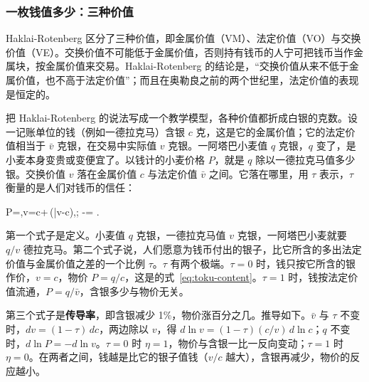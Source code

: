 
\subsubsection{一枚钱值多少：三种价值}
Haklai-Rotenberg 区分了三种价值，即金属价值（VM）、法定价值（VO）与交换价值（VE）。交换价值不可能低于金属价值，否则持有钱币的人宁可把钱币当作金属块，按金属价值来交易。Haklai-Rotenberg 的结论是，“交换价值从来不低于金属价值，也不高于法定价值”；而且在奥勒良之前的两个世纪里，法定价值的表现是恒定的\cite{haklai2011}。

把 Haklai-Rotenberg 的说法写成一个教学模型，各种价值都折成白银的克数。设一记账单位的钱（例如一德拉克马）含银 $c$ 克，这是它的金属价值；它的法定价值相当于 $\bar v$ 克银，在交易中实际值 $v$ 克银。一阿塔巴小麦值 $q$ 克银，$q$ 变了，是小麦本身变贵或变便宜了。以钱计的小麦价格 $P$，就是 $q$ 除以一德拉克马值多少银。交换价值 $v$ 落在金属价值 $c$ 与法定价值 $\bar v$ 之间。它落在哪里，用 $\tau$ 表示，$\tau$ 衡量的是人们对钱币的信任：
\begin{keyeq}
P=,\qquad v=c+\tau\,(\bar v-c),\le\tau{};\qquad
\eta\equiv-= .\label{eq:greek-value}
\end{keyeq}
第一个式子是定义。小麦值 $q$ 克银，一德拉克马值 $v$ 克银，一阿塔巴小麦就要 $q/v$ 德拉克马。第二个式子说，人们愿意为钱币付出的银子，比它所含的多出法定价值与金属价值之差的一个比例 $\tau$。$\tau$ 有两个极端。$\tau=0$ 时，钱只按它所含的银作价，$v=c$，物价 $P=q/c$，这是的式~\eqref{eq:toku-content}。$\tau=1$ 时，钱按法定价值流通，$P=q/\bar v$，含银多少与物价无关。

第三个式子是\textbf{传导率}，即含银减少 1\%，物价涨百分之几。推导如下。$\bar v$ 与 $\tau$ 不变时，$dv=(1-\tau)\,dc$，两边除以 $v$，得 $d\ln v=(1-\tau)(c/v)\,d\ln c$；$q$ 不变时，$d\ln P=-d\ln v$。$\tau=0$ 时 $\eta=1$，物价与含银一比一反向变动；$\tau=1$ 时 $\eta=0$。在两者之间，钱越是比它的银子值钱（$v/c$ 越大），含银再减少，物价的反应越小。

